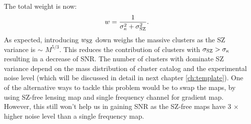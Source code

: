 The total weight is now:
 \begin{equation}
 w = \frac{1}{\sigma_{\kappa}^{2} + \sigma_{\rm SZ}^{2}}.
\label{eq_cluster_weight}
 \end{equation}
 As expected, introducing $w_{\rm SZ}$ down weighs the massive clusters as the SZ variance is $\sim$ $M^{5/3}$.
 This reduces the contribution of clusters with $\sigma_{\rm SZ} > \sigma_{\kappa}$ resulting in a decrease of SNR. 
 The number of clusters with dominate SZ variance depend on the mass distribution of cluster catalog and the experimental noise level (which will be discussed in detail in next chapter \ref{ch:template}).
 One of the alternative ways to tackle this problem would be to swap the maps, by using SZ-free lensing map and single frequency channel for gradient map.
However, this still won't help us in gaining SNR as the SZ-free maps have 3 $\times$ higher noise level than a single frequency map. %
